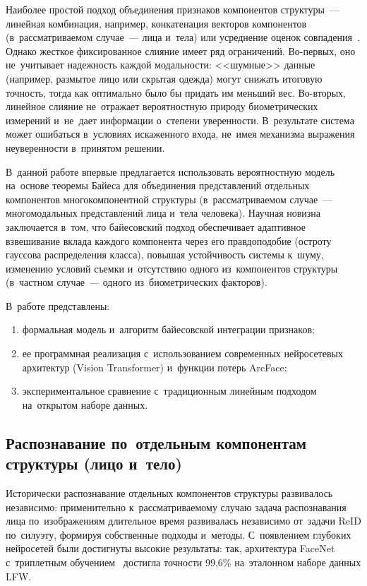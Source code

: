 Наиболее простой подход объединения признаков компонентов структуры~---
линейная комбинация,
например, конкатенация векторов компонентов (в~рассматриваемом
случае~--- лица и~тела) или усреднение оценок
совпадения~\cite{Koo2018multimodal}. Однако жесткое фиксированное
слияние имеет ряд ограничений. Во-первых, оно не~учитывает надежность
каждой модальности: <<шумные>> данные (например, размытое лицо или
скрытая одежда) могут снижать итоговую точность, тогда как оптимально
было бы придать им меньший вес. Во-вторых, линейное слияние не~отражает
вероятностную природу биометрических измерений и~не~дает информации
о~степени уверенности. В~результате система может ошибаться в~условиях
искаженного входа, не~имея механизма выражения неуверенности
в~принятом решении.

В~данной работе впервые предлагается использовать вероятностную модель
на~основе теоремы Байеса для объединения представлений отдельных
компонентов многокомпонентной структуры (в~рассматриваемом случае~---
многомодальных представлений лица и~тела человека). Научная новизна
заключается в~том, что байесовский подход
обеспечивает адаптивное взвешивание вклада каждого компонента через
его правдоподобие (остроту гауссова распределения класса), повышая
устойчивость системы к~шуму,
изменению условий съемки и~отсутствию одного из~компонентов структуры
(в~частном случае~--- одного из~биометрических факторов).

В~работе представлены:
\begin{enumerate}[label=\alph*)]
    \item формальная модель и~алгоритм байесовской интеграции
          признаков;
    \item ее программная реализация с~использованием современных
          нейросетевых архитектур (Vision Transformer) и~функции потерь
          ArcFace;
    \item экспериментальное сравнение с~традиционным линейным подходом
          на~открытом наборе данных.
\end{enumerate}

\subsection{Распознавание по~отдельным компонентам структуры (лицо и~тело)}\label{sec:ch2/face-body}

Исторически распознавание отдельных компонентов структуры развивалось
независимо: применительно к~рассматриваемому случаю задача
распознавания лица по~изображениям длительное время развивалась
независимо от~задачи ReID по~силуэту, формируя собственные подходы
и~методы. С~появлением глубоких нейросетей были достигнуты высокие
результаты: так, архитектура FaceNet с~триплетным
обучением~\cite{Schroff2015facenet} достигла точности 99,6\%
на~эталонном наборе данных LFW.

